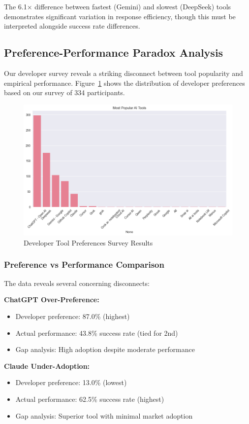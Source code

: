 \documentclass[conference]{IEEEtran}
\begin{document}
The 6.1× difference between fastest (Gemini) and slowest (DeepSeek) tools demonstrates significant variation in response efficiency, though this must be interpreted alongside success rate differences.

\subsection{Preference-Performance Paradox Analysis}

Our developer survey reveals a striking disconnect between tool popularity and empirical performance. Figure~\ref{fig:tool_preferences} shows the distribution of developer preferences based on our survey of 334 participants.

\begin{figure}[htbp]
\centering
\includegraphics[width=0.75\linewidth]{images/survey/most_popular_ai_tools.png}
\caption{Developer Tool Preferences Survey Results}
\label{fig:tool_preferences}
\end{figure}

\subsubsection{Preference vs Performance Comparison}

The data reveals several concerning disconnects:

\textbf{ChatGPT Over-Preference:}
\begin{itemize}
    \item Developer preference: 87.0\% (highest)
    \item Actual performance: 43.8\% success rate (tied for 2nd)
    \item Gap analysis: High adoption despite moderate performance
\end{itemize}

\textbf{Claude Under-Adoption:}
\begin{itemize}
    \item Developer preference: 13.0\% (lowest)
    \item Actual performance: 62.5\% success rate (highest)
    \item Gap analysis: Superior tool with minimal market adoption
\end{itemize}
\end{document}

